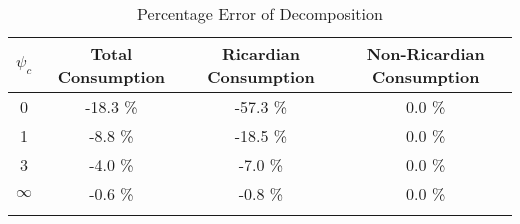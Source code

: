   \begin{table}
\begin{center}
    \caption{Percentage Error of Decomposition}\label{table:error}
\begin{tabular}{cccc}  
$\psi_c$ & Total Consumption & Ricardian Consumption & Non-Ricardian Consumption 
\\ \toprule  
0 & -18.3 \%  & -57.3 \% & 0.0 \% \\ 
1 & -8.8 \%  & -18.5 \% & 0.0 \% \\ 
3 & -4.0 \%  & -7.0 \% & 0.0 \% \\ 
$\infty$ & -0.6 \%  & -0.8 \% & 0.0 \% \\ 
\\ \bottomrule 
 \end{tabular}
\end{center}
\end{table}
